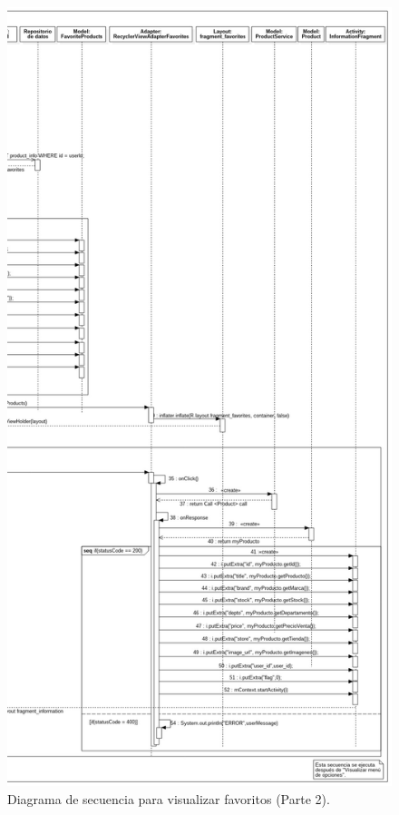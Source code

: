 \FloatBarrier
\begin{figure}[htbp!]
		\centering
			\includegraphics[width=.65 \textwidth]{imagenes/Diagramas_UserApp/Nuevos_diagramas/Favoritos2}
		\caption{Diagrama de secuencia para visualizar favoritos (Parte 2).}
		\label{image:favs3}
\end{figure}
\FloatBarrier

